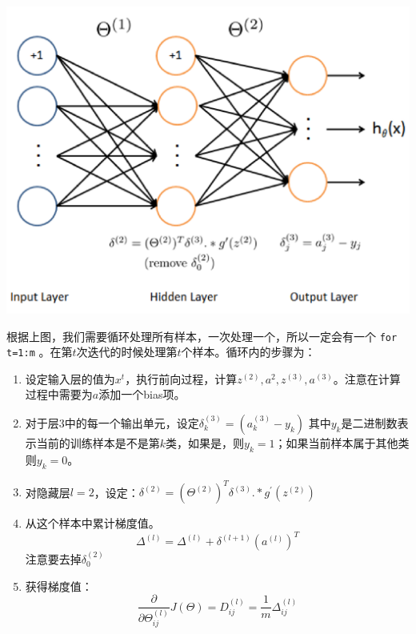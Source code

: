 \documentclass[10pt,a4paper,UTF8]{article}
\begin{document}
\begin{center}
\includegraphics[width=.9\linewidth]{../../img/computer_ng/20171014BPimplement.png}
\end{center}

根据上图，我们需要循环处理所有样本，一次处理一个，所以一定会有一个 \texttt{for t=1:m} 。在第\(t\)次迭代的时候处理第\(t\)个样本。循环内的步骤为：

\begin{enumerate}
\item 设定输入层的值为\(x^{t}\)，执行前向过程，计算\(z^{(2)},a^{2},z^{(3)},a^{(3)}\)。注意在计算过程中需要为\(a\)添加一个bias项。
\item 对于层3中的每一个输出单元，设定\(\delta_{k}^{(3)} = ( a_{k}^{(3)} - y_{k})\) 其中\(y_{k}\)是二进制数表示当前的训练样本是不是第\(k\)类，如果是，则\(y_{k} = 1\)；如果当前样本属于其他类则\(y_{k}=0\)。
\item 对隐藏层\(l=2\)，设定：\(\delta^{(2)} = (\Theta^{(2)})^{T}\delta^{(3)}.*g^{'}(z^{(2)})\)
\item 从这个样本中累计梯度值。\[ \Delta^{(l)} = \Delta^{(l)} +\delta^{(l+1)}(a^{(l)})^{T} \] 注意要去掉\(\delta_{0}^{(2)}\)
\item 获得梯度值：\[\frac{\partial}{\partial \Theta_{ij}^{(l)}}J(\Theta) = D_{ij}^{(l)} = \frac{1}{m}\Delta_{ij}^{(l)}\]
\end{enumerate}
\end{document}
